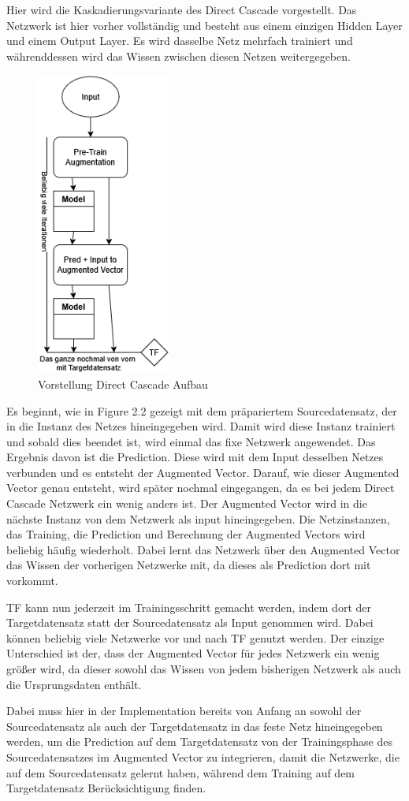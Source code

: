 Hier wird die Kaskadierungsvariante des Direct Cascade vorgestellt. 
Das Netzwerk ist hier vorher vollständig und besteht aus einem einzigen Hidden Layer und einem Output Layer. 
Es wird dasselbe Netz mehrfach trainiert und währenddessen wird das Wissen zwischen diesen Netzen weitergegeben. 

\begin{figure}[htpb]
    \includegraphics[height=10cm]{../../Graphiken/direct_cascade.png}
    \caption{\label{fig:directcascade} Vorstellung Direct Cascade Aufbau}
\end{figure}

Es beginnt, wie in Figure 2.2 gezeigt mit dem präpariertem Sourcedatensatz, der in die Instanz des Netzes hineingegeben wird. 
Damit wird diese Instanz trainiert und sobald dies beendet ist, wird einmal das fixe Netzwerk angewendet. Das Ergebnis davon ist 
die Prediction. Diese wird mit dem Input desselben Netzes verbunden und es entsteht der Augmented Vector. Darauf, wie dieser Augmented 
Vector genau entsteht, wird später nochmal eingegangen, da es bei jedem Direct Cascade Netzwerk ein wenig anders ist. Der Augmented 
Vector wird in die nächste Instanz von dem Netzwerk als input hineingegeben. Die Netzinstanzen, das Training, die Prediction und 
Berechnung der Augmented Vectors wird beliebig häufig wiederholt. Dabei lernt das Netzwerk über den Augmented Vector das Wissen 
der vorherigen Netzwerke mit, da dieses als Prediction dort mit vorkommt. 

TF kann nun jederzeit im Trainingsschritt gemacht werden, indem dort der Targetdatensatz statt der Sourcedatensatz als Input genommen 
wird. Dabei können beliebig viele Netzwerke vor und nach TF genutzt werden. Der einzige Unterschied ist der, dass der Augmented Vector 
für jedes Netzwerk ein wenig größer wird, da dieser sowohl das Wissen von jedem bisherigen Netzwerk als auch die Ursprungsdaten enthält. 

Dabei muss hier in der Implementation bereits von Anfang an sowohl der Sourcedatensatz als auch der Targetdatensatz in das feste Netz 
hineingegeben werden, um die Prediction auf dem Targetdatensatz von der Trainingsphase des Sourcedatensatzes im Augmented Vector zu 
integrieren, damit die Netzwerke, die auf dem Sourcedatensatz gelernt haben, während dem Training auf dem Targetdatensatz Berücksichtigung finden. 
